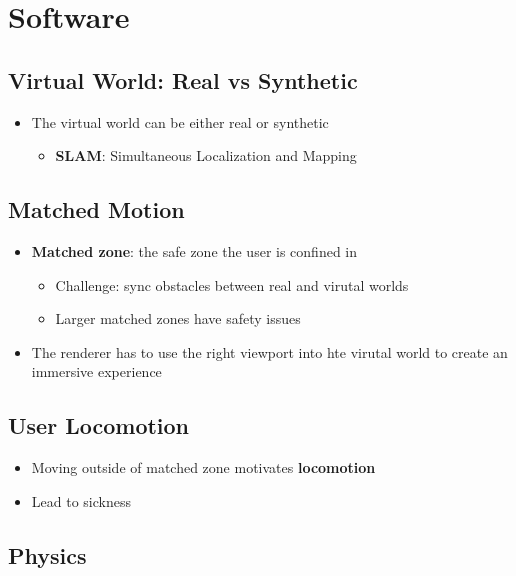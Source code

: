 \chapter{Software}

\section{Virtual World: Real vs Synthetic}

  \begin{itemize}
    \item The virtual world can be either real or synthetic
    \begin{itemize}
      \item \textbf{SLAM}: Simultaneous Localization and Mapping
    \end{itemize}
  \end{itemize}

\section{Matched Motion}

  \begin{itemize}
    \item \textbf{Matched zone}: the safe zone the user is confined in
    \begin{itemize}
      \item Challenge: sync obstacles between real and virutal worlds
      \item Larger matched zones have safety issues
    \end{itemize}

    \item The renderer has to use the right viewport into hte virutal
    world to create an immersive experience
  \end{itemize}

\section{User Locomotion}

  \begin{itemize}
    \item Moving outside of matched zone motivates \textbf{locomotion}
    \item Lead to sickness
  \end{itemize}

\section{Physics}

